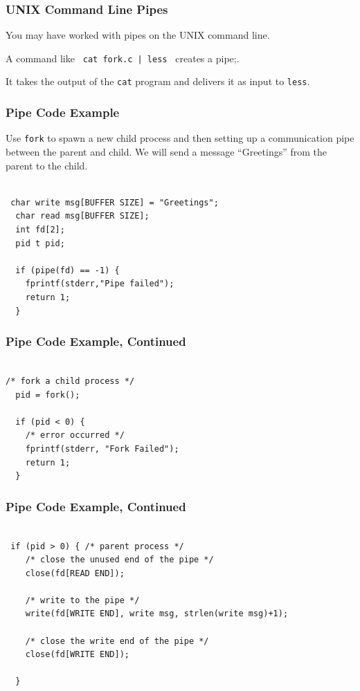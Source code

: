 \begin{frame}
\frametitle{UNIX Command Line Pipes}

You may have worked with pipes on the UNIX command line. 

A command like \texttt{ cat fork.c | less } creates a pipe;.

It takes the output of the \texttt{cat} program and delivers it as input to \texttt{less}.

\end{frame}

\begin{frame}[fragile]
\frametitle{Pipe Code Example}

Use \texttt{fork} to spawn a new child process and then setting up a communication pipe between the parent and child. We will send a message ``Greetings'' from the parent to the child.

\begin{verbatim}

 char write msg[BUFFER SIZE] = "Greetings"; 
  char read msg[BUFFER SIZE];
  int fd[2];
  pid t pid;

  if (pipe(fd) == -1) {
    fprintf(stderr,"Pipe failed");
    return 1;
  }

\end{verbatim}


\end{frame}

\begin{frame}[fragile]
\frametitle{Pipe Code Example, Continued}

\begin{verbatim}

/* fork a child process */
  pid = fork();
  
  if (pid < 0) { 
    /* error occurred */ 
    fprintf(stderr, "Fork Failed"); 
    return 1;
  }

\end{verbatim}


\end{frame}

\begin{frame}[fragile]
\frametitle{Pipe Code Example, Continued}


\begin{verbatim}

 if (pid > 0) { /* parent process */
    /* close the unused end of the pipe */ 
    close(fd[READ END]);
    
    /* write to the pipe */
    write(fd[WRITE END], write msg, strlen(write msg)+1);
    
    /* close the write end of the pipe */
    close(fd[WRITE END]);
    
  } 

\end{verbatim}


\end{frame}

